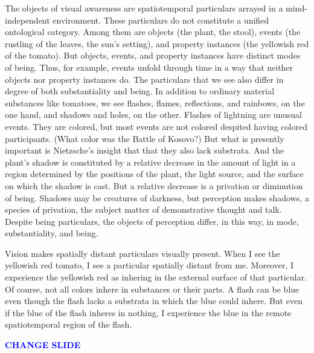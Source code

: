 \documentclass[12pt]{article}
\newcommand{\change}{\textcolor{blue}{\textbf{CHANGE SLIDE}}}
\begin{document}
The objects of visual awareness are spatiotemporal particulars arrayed in a mind-independent environment. These particulars do not constitute a unified ontological category. Among them are objects (the plant, the stool), events (the rustling of the leaves, the sun's setting), and property instances (the yellowish red of the tomato). But objects, events, and property instances have distinct modes of being. Thus, for example, events unfold through time in a way that neither objects nor property instances do. The particulars that we see also differ in degree of both substantiality and being. In addition to ordinary material substances like tomatoes, we see flashes, flames, reflections, and rainbows, on the one hand, and shadows and holes, on the other. Flashes of lightning are unusual events. They are colored, but most events are not colored despited having colored participants. (What color was the Battle of Kosovo?) But what is presently important is Nietzsche's insight that that they also lack substrata. And the plant's shadow is constituted by a relative decrease in the amount of light in a region determined by the positions of the plant, the light source, and the surface on which the shadow is cast. But a relative decrease is a privation or diminution of being. Shadows may be creatures of darkness, but perception makes shadows, a species of privation, the subject matter of demonstrative thought and talk. Despite being particulars, the objects of perception differ, in this way, in mode, substantiality, and being.

Vision makes spatially distant particulars visually present. When I see the yellowish red tomato, I see a particular spatially distant from me. Moreover, I experience the yellowish red as inhering in the external surface of that particular. Of course, not all colors inhere in substances or their parts. A flash can be blue even though the flash lacks a substrata in which the blue could inhere. But even if the blue of the flash inheres in nothing, I experience the blue in the remote spatiotemporal region of the flash. 

\change
\end{document}
